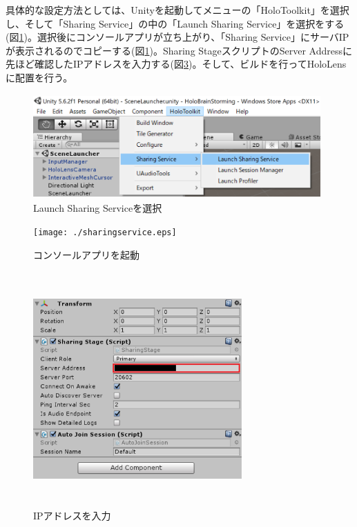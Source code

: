 \documentclass[11pt,a4j, titlepage]{jarticle} %
\begin{document}
具体的な設定方法としては、Unityを起動してメニューの「HoloToolkit」を選択し、そして「Sharing Service」の中の「Launch Sharing Service」を選択をする(図\ref{fig:toolbar})。選択後にコンソールアプリが立ち上がり、「Sharing Service」にサーバIPが表示されるのでコピーする(図\ref{fig:toolbar})。Sharing StageスクリプトのServer Addressに先ほど確認したIPアドレスを入力する(図\ref{fig:sharingstage})。そして、ビルドを行ってHoloLensに配置を行う。

\begin{figure}[H]
  \begin{center}
    \includegraphics[clip,height=4.0cm,width=11.0cm]{./toolbar.eps}
    \caption{Launch Sharing Serviceを選択}
    \label{fig:toolbar}
  \end{center}
\end{figure}

\begin{figure}[H]
  \begin{center}
    \texttt{[image: ./sharingservice.eps]}
    \caption{コンソールアプリを起動}
    \label{fig:sharingservice}
  \end{center}
\end{figure}

\begin{figure}[H]
  \begin{center}
    \includegraphics[clip,height=9.0cm,width=8.0cm]{./sharingstage.eps}
    \caption{IPアドレスを入力}
    \label{fig:sharingstage}
  \end{center}
\end{figure}
\end{document}
